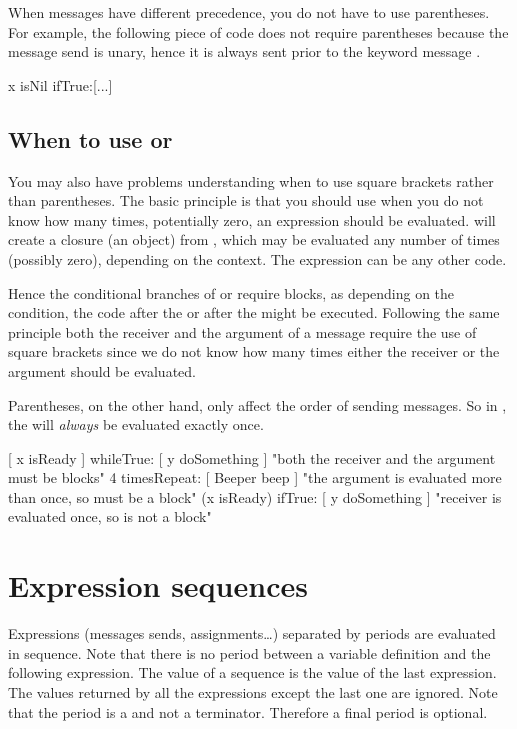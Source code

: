 \documentclass[a4paper,10pt,twoside]{book}
\begin{document}
When messages have different precedence, you do not have to use parentheses. For example, the following piece of code does not require parentheses because the message send   is unary, hence it is always sent prior to the keyword message .
\begin{code}{}
x isNil ifTrue:[...]
\end{code}



\subsection{When to use \lct{[ ]} or \lct{( )}}
You may also have problems understanding when to use square brackets rather than parentheses.
The basic principle is that you should use \ct{[ ]} when you do not know how many times, potentially zero, an expression should be evaluated.
 will create a  closure (\ie an object) from , which may be evaluated any number of times (possibly zero), depending on the context. The expression can be any other code.

Hence the conditional branches of  or  require blocks, as depending on the condition, the code after the  or after the  might be executed. Following the same principle both the receiver and the argument of a  message require the use of square brackets since we do not know how many times either the receiver or the argument should be evaluated.

Parentheses, on the other hand, only affect the order of sending messages.
So in , the  will \emph{always} be evaluated exactly once.

\begin{code}{}
[ x isReady ] whileTrue: [ y doSomething ]   "both the receiver and the argument must be blocks"
4 timesRepeat: [ Beeper beep ]                   "the argument is evaluated more than once, so must be a block"
(x isReady) ifTrue: [ y doSomething ]           "receiver is evaluated once, so is not a block"
\end{code}

\section{Expression sequences}
Expressions (\ie messages sends, assignments\dots) separated by periods are evaluated in sequence.
Note that there is no period between a variable definition and the following expression.
The value of a sequence is the value of the last expression. The values returned by all the 
expressions except the last one are ignored. Note that the period is a  and not a terminator. Therefore a final period is optional.
\end{document}
